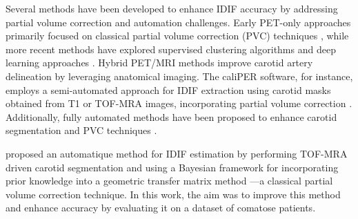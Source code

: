 Several methods have been developed to enhance IDIF accuracy by addressing partial volume correction and automation challenges.
Early PET-only approaches primarily focused on classical partial volume correction (PVC) techniques \cite{mourik2009image}, while more recent methods have explored supervised clustering algorithms \cite{lyoo2014image} and deep learning approaches \cite{chavan2024end,ferrante2024physically}.
Hybrid PET/MRI methods improve carotid artery delineation by leveraging anatomical imaging. The caliPER software, for instance, employs a semi-automated approach for IDIF extraction using carotid masks obtained from T1 or TOF-MRA images, incorporating partial volume correction \cite{dassanayake2022caliper}.
Additionally, fully automated methods have been proposed to enhance carotid segmentation and PVC techniques \cite{sari2017estimation, jochimsen2016fully, khalighi2018image, sundar2019towards}.

\citeauthor{irace2021bayesian} \cite{irace2021bayesian} proposed an automatique method for IDIF estimation by performing TOF-MRA driven carotid segmentation and using a Bayesian framework for incorporating prior knowledge into a geometric transfer matrix method \cite{rousset1998correction}---a classical partial volume correction technique.
In this work, the aim was to improve this method and enhance accuracy by evaluating it on a dataset of comatose patients.
